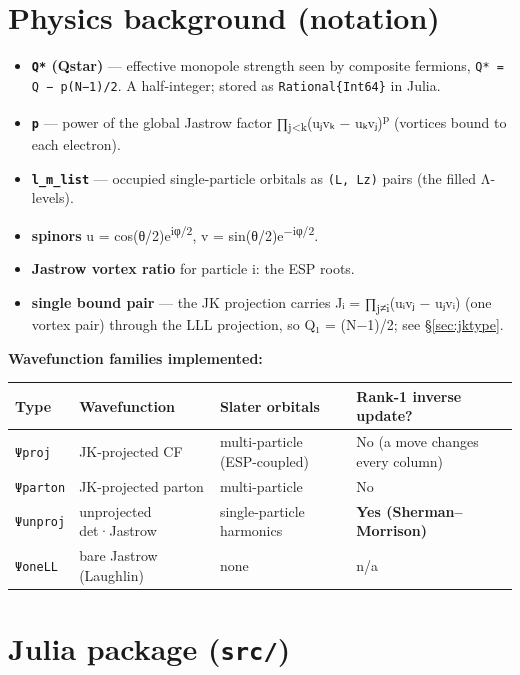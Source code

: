\documentclass[11pt]{article}
\newcommand{\code}[1]{\texttt{#1}}
\begin{document}
\section{Physics background (notation)}

\begin{itemize}
\item \textbf{\code{Q*} (Qstar)} --- effective monopole strength seen by composite fermions,
  \code{Q* = Q − p(N−1)/2}. A half-integer; stored as \code{Rational\{Int64\}} in Julia.
\item \textbf{\code{p}} --- power of the global Jastrow factor ∏\textsubscript{j<k}(uⱼvₖ − uₖvⱼ)\textsuperscript{p}
  (vortices bound to each electron).
\item \textbf{\code{l\_m\_list}} --- occupied single-particle orbitals as \code{(L, Lz)} pairs
  (the filled Λ-levels).
\item \textbf{spinors} u = cos(θ/2)e\textsuperscript{iφ/2}, v = sin(θ/2)e\textsuperscript{−iφ/2}.
\item \textbf{Jastrow vortex ratio} for particle i: the ESP roots.
\item \textbf{single bound pair} --- the JK projection carries Jᵢ = ∏\textsubscript{j≠i}(uᵢvⱼ − uⱼvᵢ)
  (one vortex pair) through the LLL projection, so Q₁ = (N−1)/2; see §\ref{sec:jktype}.
\end{itemize}

\textbf{Wavefunction families implemented:}

\begin{center}\small
\begin{tabular}{@{}l l l l@{}}
\toprule
Type & Wavefunction & Slater orbitals & Rank-1 inverse update? \\
\midrule
\code{Ψproj}   & JK-projected CF & multi-particle (ESP-coupled) & No (a move changes every column) \\
\code{Ψparton} & JK-projected parton & multi-particle & No \\
\code{Ψunproj} & unprojected det·Jastrow & single-particle harmonics & \textbf{Yes (Sherman--Morrison)} \\
\code{ΨoneLL}  & bare Jastrow (Laughlin) & none & n/a \\
\bottomrule
\end{tabular}
\end{center}

\section{Julia package (\code{src/})}
\end{document}

